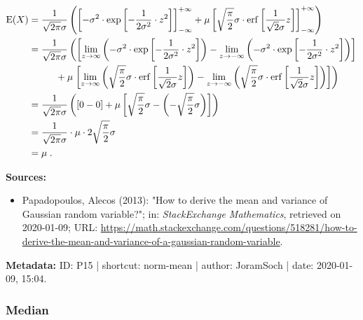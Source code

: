 \documentclass[a4paper,12pt,twoside]{book}
\begin{document}
\begin{equation} \label{eq:norm-mean-norm-mean-s3}
\begin{split}
\mathrm{E}(X) &= \frac{1}{\sqrt{2 \pi} \sigma} \left( \left[ -\sigma^2 \cdot \exp \left[ -\frac{1}{2 \sigma^2} \cdot z^2 \right] \right]_{-\infty}^{+\infty} + \mu \left[ \sqrt{\frac{\pi}{2}} \sigma \cdot \mathrm{erf} \left[ \frac{1}{\sqrt{2} \sigma} z \right] \right]_{-\infty}^{+\infty} \right) \\
&= \frac{1}{\sqrt{2 \pi} \sigma} \left( \left[ \lim_{z \to \infty} \left( -\sigma^2 \cdot \exp \left[ -\frac{1}{2 \sigma^2} \cdot z^2 \right] \right) - \lim_{z \to -\infty} \left( -\sigma^2 \cdot \exp \left[ -\frac{1}{2 \sigma^2} \cdot z^2 \right] \right) \right] \right. \\
&\hphantom{\sqrt{2 \pi}\sigma \;} + \mu \left. \left[ \lim_{z \to \infty} \left( \sqrt{\frac{\pi}{2}} \sigma \cdot \mathrm{erf} \left[ \frac{1}{\sqrt{2} \sigma} z \right] \right) - \lim_{z \to -\infty} \left( \sqrt{\frac{\pi}{2}} \sigma \cdot \mathrm{erf} \left[ \frac{1}{\sqrt{2} \sigma} z \right] \right) \right] \right) \\
&= \frac{1}{\sqrt{2 \pi} \sigma} \left( [0 - 0] + \mu \left[ \sqrt{\frac{\pi}{2}} \sigma - \left(- \sqrt{\frac{\pi}{2}} \sigma \right) \right] \right) \\
&= \frac{1}{\sqrt{2 \pi} \sigma} \cdot \mu \cdot 2 \sqrt{\frac{\pi}{2}} \sigma \\
&= \mu \; .
\end{split}
\end{equation}



\vspace{1em}
\textbf{Sources:}
\begin{itemize}
\item Papadopoulos, Alecos (2013): "How to derive the mean and variance of Gaussian random variable?"; in: \textit{StackExchange Mathematics}, retrieved on 2020-01-09; URL: \url{https://math.stackexchange.com/questions/518281/how-to-derive-the-mean-and-variance-of-a-gaussian-random-variable}.
\end{itemize}


\vspace{1em}
\textbf{Metadata:} ID: P15 | shortcut: norm-mean | author: JoramSoch | date: 2020-01-09, 15:04.
\vspace{1em}



\subsubsection[\textbf{Median}]{Median} \label{sec:norm-med}
\setcounter{equation}{0}
\end{document}
